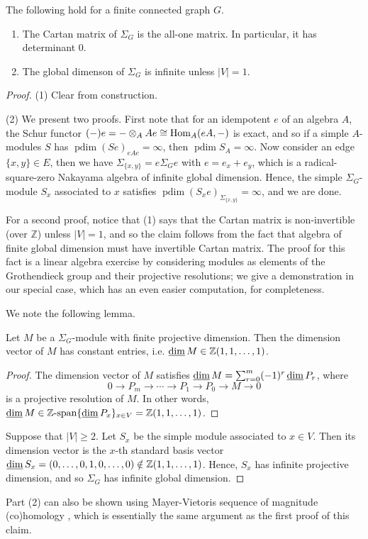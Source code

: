 \documentclass[a4paper,leqno]{amsart}
\begin{document}
\begin{prop}\label{prop:cartan gldim}
The following hold for a finite connected graph $G$.
\begin{enumerate}
    \item The Cartan matrix of $\Sigma_G$ is the all-one matrix.  In particular, it has determinant $0$.
    
    \item The global dimenson of $\Sigma_G$ is infinite unless $|V|=1$.
\end{enumerate}
\end{prop}
\begin{proof}
 (1)  Clear from construction.

 (2) We present two proofs.  First note that for an idempotent $e$ of an algebra $A$, the Schur functor $(-)e=-\otimes_AAe\cong \operatorname{Hom}_A(eA,-)$ is exact, and so if a simple $A$-modules $S$ has $\operatorname{pdim}(Se)_{eAe}=\infty$, then $\operatorname{pdim}S_{A}=\infty$.  Now consider an edge $\{x,y\}\in E$, then we have $\Sigma_{\{x,y\}} = e\Sigma_Ge$ with $e=e_x+e_y$, which is a radical-square-zero Nakayama algebra of infinite global dimension.  Hence, the simple $\Sigma_G$-module $S_x$ associated to $x$ satisfies $\operatorname{pdim}(S_xe)_{\Sigma_{\{x,y\}}}=\infty$, and we are done.

 For a second proof, notice that (1) says that the Cartan matrix is non-invertible (over $\mathbb{Z}$) unless $|V|=1$, and so the claim follows from the fact that algebra of finite global dimension must have invertible Cartan matrix.  The proof for this fact is a linear algebra exercise by considering  modules as elements of the Grothendieck group and their projective resolutions; we give a demonstration in our special case, which has an even easier computation, for completeness.

We note the following lemma.
\begin{lem}\label{lem:fin pdim module dimvec}
Let $M$ be a $\Sigma_G$-module with finite projective dimension. 
Then the dimension vector of $M$ has constant entries, i.e. $\operatorname{\underline{dim}} M\in \mathbb{Z}(1,1,\ldots,1)$.
\end{lem}
\begin{proof}
The dimension vector of $M$ satisfies $\operatorname{\underline{dim}} M = \sum_{r=0}^m(-1)^r \operatorname{\underline{dim}} P_r$, where
$$0\to P_m\to \cdots \to P_1\to P_0\to M\to 0$$
is a projective resolution of $M$.  In other words, $\operatorname{\underline{dim}} M \in \mathbb{Z}\text{-span} \{\operatorname{\underline{dim}} P_x\}_{x\in V} = \mathbb{Z}(1,1,\ldots, 1)$.    
\end{proof}

Suppose that $|V|\geq 2$.
Let $S_x$ be the simple module associated to $x\in V$.  Then its dimension vector is the $x$-th standard basis vector $\operatorname{\underline{dim}} S_x=(0,\dots,0,1,0,\dots,0)\notin \mathbb Z(1,1,\dots,1)$.  Hence, $S_x$ has infinite projective dimension, and so $\Sigma_G$ has infinite global dimension.
\end{proof}
\begin{rmk}\label{rmk:mayer-vietoris}
    Part (2) can also be shown using  Mayer-Vietoris sequence of magnitude (co)homology \cite{BK21}, which is essentially the same argument as the first proof of this claim.
\end{rmk}
\end{document}
